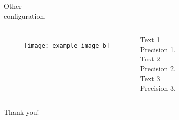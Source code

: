 \documentclass[thicklines,fleqn,xcolor=dvipsnames,compress,12pt,aspectratio=169]{beamer}
\begin{document}
\begin{frame}{Other\\ configuration.}
    
    \begin{columns}
            
        
            \begin{figure}
                \texttt{[image: example-image-b]}
            \end{figure}
        
            
            {\large Text 1}\\
            {\color{gray} Precision 1.}\\\vspace{1em}
            {\large Text 2}\\
            {\color{gray} Precision 2.}\\\vspace{1em} 
            {\large Text 3}\\
            {\color{gray} Precision 3.}
         
    \end{columns}
    
\end{frame}


\begin{frame}
    
    \begin{columns}
            {\Large Thank you!}

    \end{columns}
    
\end{frame}
\end{document}
